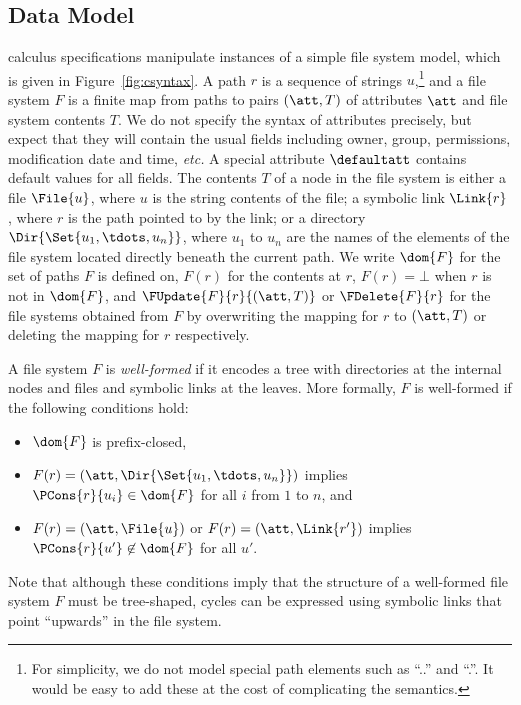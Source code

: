 \subsection{Data Model}

\forest{} calculus specifications manipulate instances of a simple
file system model, which is given in Figure~\ref{fig:csyntax}. A path
$r$ is a sequence of strings $u$,\footnote{For simplicity, we do not
  model special path elements such as ``..'' and ``.''.  It would be
  easy to add these at the cost of complicating the semantics.} and a
file system $F$ is a finite map from paths to pairs $(\att,T)$ of
attributes $\att$ and file system contents $T$.  We do not specify the
syntax of attributes precisely, but expect that they will contain the
usual fields including owner, group, permissions, modification date
and time, {\it etc.} A special attribute $\defaultatt$ contains
default values for all fields. The contents $T$ of a node in the file
system is either a file $\File{u}$, where $u$ is the string contents
of the file; a symbolic link $\Link{r}$, where $r$ is the path pointed
to by the link; or a directory $\Dir{\Set{u_1,\tdots,u_n}}$, where
$u_1$ to $u_n$ are the names of the elements of the file system
located directly beneath the current path. We write $\dom{F}$ for the
set of paths $F$ is defined on, $F(r)$ for the contents at $r$, $F(r)
= \bot$ when $r$ is not in $\dom{F}$, and $\FUpdate{F}{r}{(\att,T)}$
or $\FDelete{F}{r}$ for the file systems obtained from $F$ by
overwriting the mapping for $r$ to $(\att,T)$ or deleting the mapping
for $r$ respectively.

A file system $F$ is {\em well-formed} if it encodes a tree with
directories at the internal nodes and files and symbolic links at the
leaves. More formally, $F$ is well-formed if the following conditions
hold:
%
\begin{itemize}
\item $\dom{F}$ is prefix-closed,
\item $F(r) = (\att,\Dir{ \Set{u_1,\tdots,u_n} })$ implies
  $\PCons{r}{u_i} \in \dom{F}$ for all $i$ from $1$ to $n$, and
\item $F(r) = (\att,\File{u})$ or $F(r) = (\att,\Link{r'})$ implies
  $\PCons{r}{u'} \not\in \dom{F}$ for all $u'$.
\end{itemize}
%
Note that although these conditions imply that the structure of a
well-formed file system $F$ must be tree-shaped, cycles can be
expressed using symbolic links that point ``upwards'' in the file
system.

